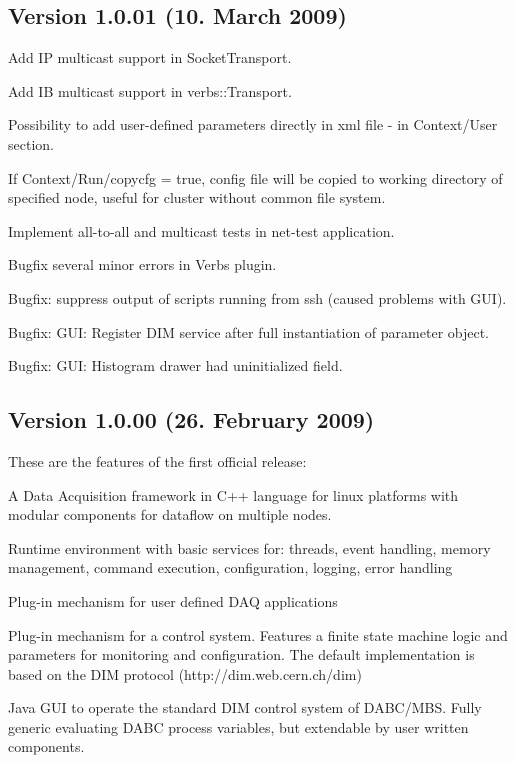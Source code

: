 \subsection{Version 1.0.01 (10. March 2009)} 
\bnum
\item Add IP multicast support in SocketTransport.
\item Add IB multicast support in verbs::Transport.
\item Possibility to add user-defined parameters directly in xml file - 
      in Context/User section.
\item If Context/Run/copycfg = true, config file will be copied to working
      directory of specified node, useful for cluster without common file system.
\item Implement all-to-all and multicast tests in net-test application.
\item Bugfix several minor errors in Verbs plugin.
\item Bugfix: suppress output of scripts running from ssh (caused problems with GUI).
\item Bugfix: GUI: Register DIM service after full instantiation of parameter object.
\item Bugfix: GUI: Histogram drawer had uninitialized field.
\enum

\subsection{Version 1.0.00 (26. February 2009)}
These are the features of the first official release:
\bnum
\item A Data Acquisition framework in C++ language for linux platforms
   with modular components for dataflow on multiple nodes.
   
\item Runtime environment with basic services for:
   threads, event handling, memory management, command execution, 
   configuration, logging, error handling

\item Plug-in mechanism for user defined DAQ applications

\item Plug-in mechanism for a control system. Features a finite state machine
   logic and parameters for monitoring and  configuration.
   The default implementation is based
   on the DIM protocol (http://dim.web.cern.ch/dim)

\item Java GUI to operate the standard DIM control system of DABC/MBS. 
   Fully generic evaluating DABC process variables, but extendable
   by user written components.

